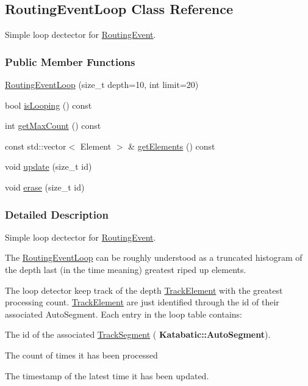 \hypertarget{classKite_1_1RoutingEventLoop}{}\subsection{Routing\+Event\+Loop Class Reference}
\label{classKite_1_1RoutingEventLoop}


Simple loop dectector for \mbox{\hyperlink{classKite_1_1RoutingEvent}{Routing\+Event}}.  


\subsubsection*{Public Member Functions}
\begin{DoxyCompactItemize}
\item 
\mbox{\hyperlink{classKite_1_1RoutingEventLoop_aa33efa06ccc2175e35eff7ac6dadffb6}{Routing\+Event\+Loop}} (size\+\_\+t depth=10, int limit=20)
\item 
bool \mbox{\hyperlink{classKite_1_1RoutingEventLoop_a78155a2b0119ac92d377fa404e348a98}{is\+Looping}} () const
\item 
int \mbox{\hyperlink{classKite_1_1RoutingEventLoop_a5744f7f01d26947fb0765bc5d1e2c3bd}{get\+Max\+Count}} () const
\item 
const std\+::vector$<$ Element $>$ \& \mbox{\hyperlink{classKite_1_1RoutingEventLoop_a7411a9e20edba3f3eeceb237dec86ff3}{get\+Elements}} () const
\item 
void \mbox{\hyperlink{classKite_1_1RoutingEventLoop_ad684b7c05480897bdbd86a5fb8363c72}{update}} (size\+\_\+t id)
\item 
void \mbox{\hyperlink{classKite_1_1RoutingEventLoop_a9b6582ce996327c65bf532396ca11b61}{erase}} (size\+\_\+t id)
\end{DoxyCompactItemize}


\subsubsection{Detailed Description}
Simple loop dectector for \mbox{\hyperlink{classKite_1_1RoutingEvent}{Routing\+Event}}. 

The \mbox{\hyperlink{classKite_1_1RoutingEventLoop}{Routing\+Event\+Loop}} can be roughly understood as a truncated histogram of the {\ttfamily depth} last (in the time meaning) greatest riped up elements.

The loop detector keep track of the {\ttfamily depth} \mbox{\hyperlink{classKite_1_1TrackElement}{Track\+Element}} with the greatest processing count. \mbox{\hyperlink{classKite_1_1TrackElement}{Track\+Element}} are just identified through the {\ttfamily id} of their associated Auto\+Segment. Each entry in the loop table contains\+:
\begin{DoxyItemize}
\item The {\ttfamily id} of the associated \mbox{\hyperlink{classKite_1_1TrackSegment}{Track\+Segment}} (\textbf{ Katabatic\+::\+Auto\+Segment}).
\item The {\ttfamily count} of times it has been processed
\item The {\ttfamily timestamp} of the latest time it has been updated.
\end{DoxyItemize}

